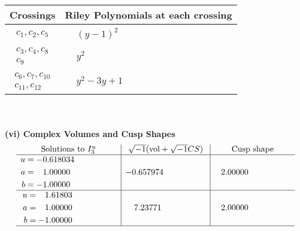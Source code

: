 \documentclass[1p]{elsarticle_modified}
\theoremstyle{definition}
\newcommand{\I}{\sqrt{-1}}
\begin{document}
\begin{tabular}{m{50pt}|m{274pt}}
Crossings & \hspace{64pt}Riley Polynomials at each crossing \\
\hline $$\begin{aligned}c_{1},c_{2},c_{5}\end{aligned}$$&$\begin{aligned}
&(y-1)^2
\end{aligned}$\\
\hline $$\begin{aligned}c_{3},c_{4},c_{8}\\c_{9}\end{aligned}$$&$\begin{aligned}
&y^2
\end{aligned}$\\
\hline $$\begin{aligned}c_{6},c_{7},c_{10}\\c_{11},c_{12}\end{aligned}$$&$\begin{aligned}
&y^2-3 y+1
\end{aligned}$\\
\hline
\end{tabular}\\~\\
\newpage\flushleft \textbf{(vi) Complex Volumes and Cusp Shapes}
$$\begin{array}{c|c|c}  
\text{Solutions to }I^u_{3}& \I (\text{vol} + \sqrt{-1}CS) & \text{Cusp shape}\\
 \hline 
\begin{aligned}
u &= -0.618034\phantom{ +0.000000I} \\
a &= \phantom{-}1.00000\phantom{ +0.000000I} \\
b &= -1.00000\phantom{ +0.000000I}\end{aligned}
 & -0.657974\phantom{ +0.000000I} & \phantom{-}2.00000\phantom{ +0.000000I} \\ \hline\begin{aligned}
u &= \phantom{-}1.61803\phantom{ +0.000000I} \\
a &= \phantom{-}1.00000\phantom{ +0.000000I} \\
b &= -1.00000\phantom{ +0.000000I}\end{aligned}
 & \phantom{-}7.23771\phantom{ +0.000000I} & \phantom{-}2.00000\phantom{ +0.000000I}\\
 \hline 
 \end{array}$$\newpage
\newpage\renewcommand{\arraystretch}{1}
\end{document}
